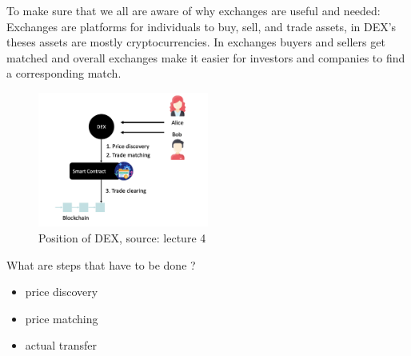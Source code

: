 \documentclass{article}
\begin{document}
To make sure that we all are aware of why exchanges are useful and needed: Exchanges are platforms for individuals to buy, sell, and trade assets, in DEX's theses assets are mostly cryptocurrencies. In exchanges buyers and sellers get matched and overall exchanges make it easier for investors and companies to find a corresponding match.
\begin{figure}[h]
    \centering
    \includegraphics[width=0.5\textwidth]{Bildschirmfoto 2024-04-02 um 13.49.50.png} %
    \caption{Position of DEX, \scriptsize{source: lecture 4}}
    \label{fig:DoS-attack}
\end{figure}

What are steps that have to be done ?
\begin{itemize}
    \item {price discovery}
    \item {price matching}
    \item {actual transfer}
\end{itemize}
\end{document}
